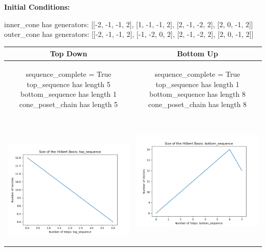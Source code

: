 \documentclass[10pt]{article}
\begin{document}
\textbf{Initial Conditions:}
\begin{SAGE}
inner_cone has generators: 
[[-2, -1, -1, 2], [1, -1, -1, 2], [2, -1, -2, 2], [2, 0, -1, 2]]
outer_cone has generators: 
[[-2, -1, -1, 2], [-1, -2, 0, 2], [2, -1, -2, 2], [2, 0, -1, 2]]

\end{SAGE}
\begin{tabular}{c|c}
\textbf{Top Down} & \textbf{Bottom Up} \\ \hline  
\begin{SAGE}
	sequence_complete = True
	top_sequence has length 5
	bottom_sequence has length 1
	cone_poset_chain has length 5
\end{SAGE} 
&
\begin{SAGE}
	sequence_complete = True
	top_sequence has length 1
	bottom_sequence has length 8
	cone_poset_chain has length 8
\end{SAGE} 
\\ \hline
\
\begin{minipage}{.45\textwidth}
\includegraphics[width=\textwidth]{"DATA/4d/4 generators 2 bound H/top_sequence SIZE"}
\end{minipage} &
\begin{minipage}{.45\textwidth}
\includegraphics[width=\textwidth]{"DATA/4d/4 generators 2 bound H bottomup/bottom_sequence SIZE"}

\end{minipage}
\end{tabular}
\end{document}
